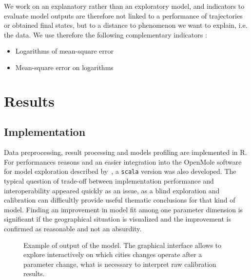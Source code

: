 \documentclass[Royal,sageh,times]{sagej}
\begin{document}
We work on an explanatory rather than an exploratory model, and indicators to evaluate model outputs are therefore not linked to a performance of trajectories or obtained final states, but to a distance to phenomenon we want to explain, i.e. the data. We use therefore the following complementary indicators :

\begin{itemize}
\item Logarithms of mean-square error
\item Mean-square error on logarithms
\end{itemize}







\section*{Results}



\subsection*{Implementation}

Data preprocessing, result processing and models profiling are implemented in R. For performances reasons and an easier integration into the OpenMole software for model exploration described by~\cite{reuillon2013openmole}, a \texttt{scala} version was also developed. The typical question of trade-off between implementation performance and interoperability appeared quickly as an issue, as a blind exploration and calibration can difficultly provide useful thematic conclusions for that kind of model. Finding an improvement in model fit among one parameter dimension is significant if the geographical situation is visualized and the improvement is confirmed as reasonable and not an absurdity.


\begin{figure}
\centering
\caption{Example of output of the model. The graphical interface allows to explore interactively on which cities changes operate after a parameter change, what is necessary to interpret raw calibration results.}
\end{figure}




\end{document}
